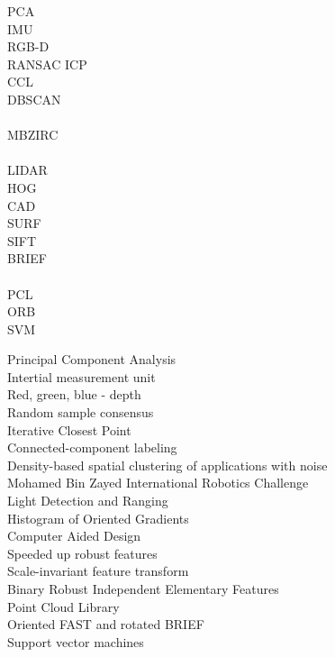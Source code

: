 \begin{symb}
    PCA \\ 
    IMU \\ 
    RGB-D \\ 
    RANSAC \newline
    ICP \\
    CCL \\
    DBSCAN \\ \\
    MBZIRC \\ \\
    LIDAR \\
    HOG \\
    CAD \\
    SURF \\
    SIFT \\
    BRIEF \\ \\
    PCL \\ 
    ORB \\
    SVM

    \newpage \noindent
    Principal Component Analysis \\
    Intertial measurement unit \\
    Red, green, blue - depth  \\
    Random sample consensus \\
    Iterative Closest Point \\
    Connected-component labeling \\
    Density-based spatial clustering of applications with noise \\ 
    Mohamed Bin Zayed International Robotics Challenge \\
    Light Detection and Ranging \\
    Histogram of Oriented Gradients \\
    Computer Aided Design \\
    Speeded up robust features \\
    Scale-invariant feature transform \\
    Binary Robust Independent Elementary Features \\
    Point Cloud Library \\
    Oriented FAST and rotated BRIEF \\
    Support vector machines
\end{symb}

